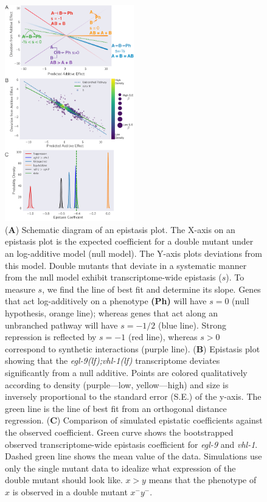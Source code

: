 \documentclass[9pt,twocolumn,twoside,lineno]{pnas-new}
\newcommand{\gene}[1]{\mbox{\emph{#1}}}
\newcommand{\eglvhl}{\gene{egl-9(lf);vhl-1(lf)}}
\begin{document}
\begin{figure}[tbhp]
  \centering
  \includegraphics[width=0.5\textwidth]{../figs/egl9vhl1-epistasis.pdf}
  \caption{
    (\textbf{A}) Schematic diagram of an epistasis plot. The X-axis on an
    epistasis plot is the expected coefficient for a double mutant under an
    log-additive model (null model). The Y-axis plots deviations from this
    model. Double mutants that deviate in a systematic manner from the null
    model exhibit transcriptome-wide epistasis ($s$). To measure $s$, we find
    the line of best fit and determine its slope. Genes that act log-additively
    on a phenotype \textbf{(Ph)} will have $s=0$ (null hypothesis, orange line);
    whereas genes that act along an unbranched pathway will have $s=-1/2$ (blue
    line). Strong repression is reflected by $s=-1$ (red line), whereas $s>0$
    correspond to synthetic interactions (purple line). (\textbf{B}) Epistasis
    plot showing that the \eglvhl{} transcriptome deviates significantly from a
    null additive. Points are colored qualitatively according to density
    (purple---low, yellow---high) and size is inversely proportional to the
    standard error (S.E.) of the y-axis. The green line is the line of best fit
    from an orthogonal distance regression. (\textbf{C}) Comparison of simulated
    epistatic coefficients against the observed coefficient. Green curve shows
    the bootstrapped observed transcriptome-wide epistasis coefficient for
    \gene{egl-9} and \gene{vhl-1}. Dashed green line shows the mean value of the
    data. Simulations use only the single mutant data to idealize what
    expression of the double mutant should look like. $x > y$ means that the
    phenotype of $x$ is observed in a double mutant $x^-y^-$. }
\label{fig:egl9epistasis}
\end{figure}
\end{document}
